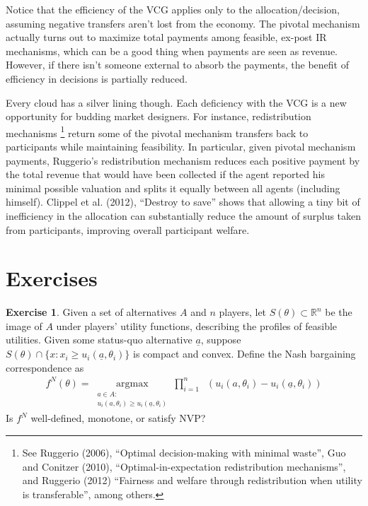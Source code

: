 \documentclass[letter, 10pt]{article}
\theoremstyle{definition}
\newtheorem{exercise}{Exercise}[section]
\newcommand{\R}{\mathbb{R}}
\begin{document}
\begin{spacing}{1.1}
Notice that the efficiency of the VCG applies only to the
allocation/decision, assuming negative transfers aren't lost from the
economy. The pivotal mechanism actually turns out to maximize total
payments among feasible, ex-post IR mechanisms, which can be a good thing when
payments are seen as revenue. However, if there isn't someone external to
absorb the payments, the benefit of efficiency in decisions is partially
reduced. 

Every cloud has a silver lining though. Each deficiency with the VCG is a
new opportunity for budding market designers. For instance, redistribution
mechanisms \footnote{See Ruggerio (2006), ``Optimal decision-making with
  minimal waste'', Guo and Conitzer (2010), ``Optimal-in-expectation
  redistribution mechanisms'', and Ruggerio (2012) ``Fairness and welfare
  through redistribution when utility is transferable'', among others.}
return some of the pivotal mechanism transfers back to participants while
maintaining feasibility. In particular, given pivotal mechanism payments,
Ruggerio's redistribution mechanism reduces each positive payment by the
total revenue that would have been collected if the agent reported his
minimal possible valuation and splits it equally between all agents
(including himself).  Clippel et al. (2012), ``Destroy to save'' shows that
allowing a tiny bit of inefficiency in the allocation can substantially
reduce the amount of surplus taken from participants, improving overall
participant welfare.

\section{Exercises}
\label{sec:exercises}

\begin{exercise}
  Given a set of alternatives $A$ and $n$ players, let $S(\theta) \subset
  \R^n$ be the image of $A$ under players' utility functions, describing
  the profiles of feasible utilities. Given some status-quo alternative
  $\underline{a}$, suppose $S(\theta) \cap \{x: x_i \ge u_i(\underline{a},
  \theta_i)\}$ is compact and convex. Define the Nash bargaining
  correspondence as
  \begin{align*}
    f^N(\theta) = \underset{\substack{a \in A:\\ u_i(a, \theta_i) \ge
        u_i(\underline{a}, \theta_i)}}{\operatorname{argmax}}
    \prod_{i=1}^n \;\;\left(u_i(a, \theta_i)
    - u_i(\underline{a}, \theta_i)\right)
  \end{align*}
  Is $f^N$ well-defined, monotone, or satisfy NVP?


\end{exercise}
\end{spacing}
\end{document}
